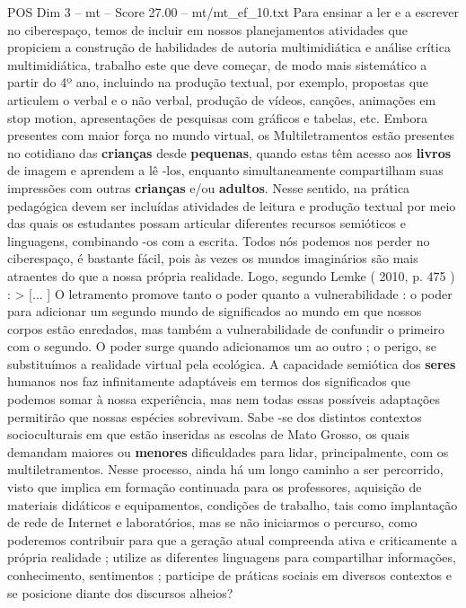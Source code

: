 \begin{textsample}{POS Dim 3 – mt – Score 27.00 – mt/mt\_ef\_10.txt}
Para ensinar a ler e a escrever no ciberespaço, temos de incluir em nossos planejamentos atividades que propiciem a construção de habilidades de autoria multimidiática e análise crítica multimidiática, trabalho este que deve começar, de modo mais sistemático a partir do 4º ano, incluindo na produção textual, por exemplo, propostas que articulem o verbal e o não verbal, produção de vídeos, canções, animações em stop motion, apresentações de pesquisas com gráficos e tabelas, etc.
Embora presentes com maior força no mundo virtual, os Multiletramentos estão presentes no cotidiano das \textbf{crianças} desde \textbf{pequenas}, quando estas têm acesso aos \textbf{livros} de imagem e aprendem a lê -los, enquanto simultaneamente compartilham suas impressões com outras \textbf{crianças} e/ou \textbf{adultos}.
Nesse sentido, na prática pedagógica devem ser incluídas atividades de leitura e produção textual por meio das quais os estudantes possam articular diferentes recursos semióticos e linguagens, combinando -os com a escrita.
Todos nós podemos nos perder no ciberespaço, é bastante fácil, pois às vezes os mundos imaginários são mais atraentes do que a nossa própria realidade.
Logo, segundo Lemke ( 2010, p. 475 ) : > [... ] O letramento promove tanto o poder quanto a vulnerabilidade : o poder para adicionar um segundo mundo de significados ao mundo em que nossos corpos estão enredados, mas também a vulnerabilidade de confundir o primeiro com o segundo.
O poder surge quando adicionamos um ao outro ; o perigo, se substituímos a realidade virtual pela ecológica.
A capacidade semiótica dos \textbf{seres} humanos nos faz infinitamente adaptáveis em termos dos significados que podemos somar à nossa experiência, mas nem todas essas possíveis adaptações permitirão que nossas espécies sobrevivam.
Sabe -se dos distintos contextos socioculturais em que estão inseridas as escolas de Mato Grosso, os quais demandam maiores ou \textbf{menores} dificuldades para lidar, principalmente, com os multiletramentos.
Nesse processo, ainda há um longo caminho a ser percorrido, visto que implica em formação continuada para os professores, aquisição de materiais didáticos e equipamentos, condições de trabalho, tais como implantação de rede de Internet e laboratórios, mas se não iniciarmos o percurso, como poderemos contribuir para que a geração atual compreenda ativa e criticamente a própria realidade ; utilize as diferentes linguagens para compartilhar informações, conhecimento, sentimentos ; participe de práticas sociais em diversos contextos e se posicione diante dos discursos alheios?

\end{textsample}

